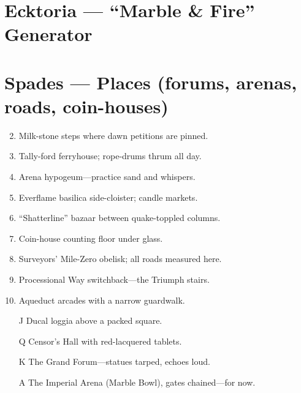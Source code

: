 \section{Ecktoria --- ``Marble \& Fire'' Generator}
\label{chap:ecktoria}

\section*{Spades --- Places (forums, arenas, roads, coin-houses)}
\label{sec:ecktoria-places}
\begin{enumerate}
\setcounter{enumi}{1}
\item Milk-stone steps where dawn petitions are pinned.
\item Tally-ford ferryhouse; rope-drums thrum all day.
\item Arena hypogeum---practice sand and whispers.
\item Everflame basilica side-cloister; candle markets.
\item ``Shatterline'' bazaar between quake-toppled columns.
\item Coin-house counting floor under glass.
\item Surveyors' Mile-Zero obelisk; all roads measured here.
\item Processional Way switchback---the Triumph stairs.
\item Aqueduct arcades with a narrow guardwalk.
\item[J] Ducal loggia above a packed square.
\item[Q] Censor's Hall with red-lacquered tablets.
\item[K] The Grand Forum---statues tarped, echoes loud.
\item[A] The Imperial Arena (Marble Bowl), gates chained---for now.
\end{enumerate}

